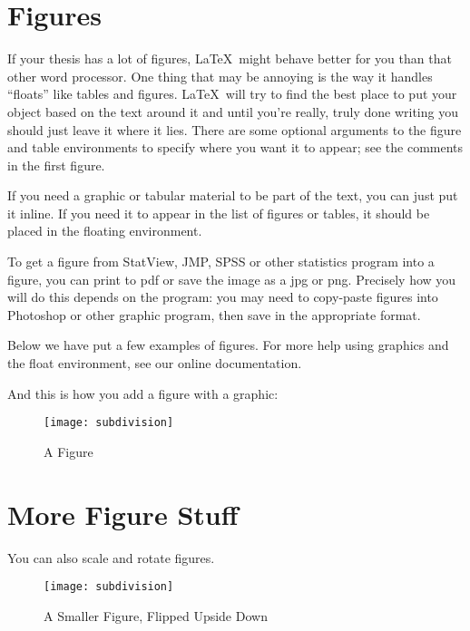 \documentclass[12pt,twoside]{reedthesis}
\begin{document}
   
   \section{Figures}
   
	If your thesis has a lot of figures, \LaTeX\ might behave better for you than that other word processor.  One thing that may be annoying is the way it handles ``floats'' like tables and figures. \LaTeX\ will try to find the best place to put your object based on the text around it and until you're really, truly done writing you should just leave it where it lies.   There are some optional arguments to the figure and table environments to specify where you want it to appear; see the comments in the first figure.

	If you need a graphic or tabular material to be part of the text, you can just put it inline. If you need it to appear in the list of figures or tables, it should be placed in the floating environment. 
	
	To get a figure from StatView, JMP, SPSS or other statistics program into a figure, you can print to pdf or save the image as a jpg or png. Precisely how you will do this depends on the program: you may need to copy-paste figures into Photoshop or other graphic program, then save in the appropriate format.
	
	Below we have put a few examples of figures. For more help using graphics and the float environment, see our online documentation.
	
	And this is how you add a figure with a graphic:
	\begin{figure}[h]
	   
	       \centering
	    \texttt{[image: subdivision]}
	     \caption{A Figure}
	 \label{subd}
	\end{figure}

\clearpage %

\section{More Figure Stuff}
You can also scale and rotate figures.
 	\begin{figure}[h!]
	   
	       \centering
	    \texttt{[image: subdivision]}
	     \caption{A Smaller Figure, Flipped Upside Down}
	 \label{subd2}
	\end{figure}
\end{document}
